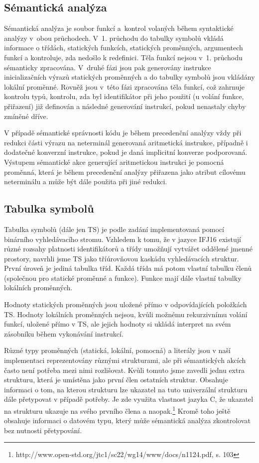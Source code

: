 \documentclass[a4paper, 11pt]{article}
\begin{document}
    \subsection{Sémantická analýza}
    Sémantická analýza je soubor funkcí a kontrol volaných během syntaktické analýzy v obou průchodech. V 1. průchodu do tabulky symbolů vkládá informace o třídách, statických funkcích, statických pro\-měnných, argumentech funkcí a kontroluje, zda nedošlo k redefinici. Těla funkcí nejsou v 1. průchodu sémanticky zpracována. V druhé fázi jsou pak generovány instrukce inicializačních výrazů statických proměnných a do tabulky symbolů jsou vkládány lokální proměnné. Rovněž jsou v této fázi zpracována těla funkcí, což zahrnuje kontrolu typů, kontrolu, zda byl identifikátor při jeho použití (u volání funkce, přiřazení) již definován a následné generování instrukcí, pokud nenastaly chyby zmíněné dříve.\par
    V případě sémantické správnosti kódu je během precedenční analýzy vždy při redukci části výrazu na neterminál generovaná aritmetická instrukce, případně i dodatečné konverzní instrukce, pokud je daná implicitní konverze podporovaná. Výstupem sémantické akce generující aritmetickou instrukci je pomocná proměnná, která je během precedenční analýzy přiřazena jako atribut cílovému neterminálu a může být dále použita při jiné redukci.\par
    \subsection{Tabulka symbolů}\label{ts}    
    Tabulka symbolů (dále jen TS) je podle zadání implementovaná pomocí binárního vyhledávacího stromu. Vzhledem k tomu, že v jazyce IFJ16 existují různé rozsahy platnosti identifikátorů a třídy umožňují vytvářet oddělené jmenné prostory, navrhli jsme TS jako tříúrovňovou kaskádu vyhledávacích struktur. První úroveň je jediná tabulka tříd. Každá třída má potom vlastní tabulku členů (společnou pro statické proměnné a funkce). Funkce mají dále vlastní tabulky lokálních proměnných. \par
    Hodnoty statických proměnných jsou uložené přímo v odpovídajících položkách TS. Hodnoty lokálních proměnných nejsou, kvůli možnému rekurzivnímu volání funkcí, uložené přímo v TS, ale jejich hodnoty si ukládá interpret na svém zásobníku během vykonávání instrukcí.\par
    Různé typy proměnných (statická, lokální, pomocná) a literály jsou v naší implementaci reprezentovány různými strukturami, ale při sémantických akcích často není potřeba mezi nimi rozlišovat. Kvůli tomuto jsme zavedli jednu extra strukturu, která je umístěna jako první člen ostatních struktur. Obsahuje informaci o tom, na kterou strukturu lze ukazatel na tuto univerzální strukturu dále přetypovat v případě potřeby. Je zde využita vlastnost jazyka C, že ukazatel na strukturu ukazuje na svého prvního člena a naopak.\footnote{http://www.open-std.org/jtc1/sc22/wg14/www/docs/n1124.pdf, s. 103} Kromě toho ještě obsahuje informaci o datovém typu, který může sémantická analýza zkontrolovat bez nutnosti přetypování.\par
\end{document}
